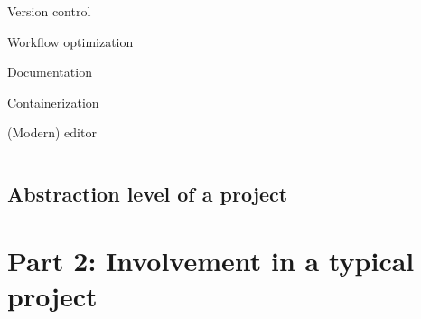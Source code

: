 \documentclass[usenames,dvipsnames]{beamer}
\theoremstyle{plain}
\theoremstyle{definition}
\begin{document}





\begin{frame}{\setframetitle{}}
  
  \begin{columns}[t]
    
    \begin{itemize}
      \item \textcolor{bg!85!normal text.fg}{Version control
      \item Workflow optimization    
      \item Documentation
      \item Containerization }
      \item (Modern) editor
    \end{itemize}
    
    \begin{figure}
      {}
    \end{figure}
  \end{columns}
  
\end{frame}


\subsection{Abstraction level of a project}

\begin{frame}{\setframetitle{}}
  {
 \begin{figure}
         {}
 \end{figure}
 }
\end{frame}

\section{Part 2: Involvement in a typical project}
\end{document}
